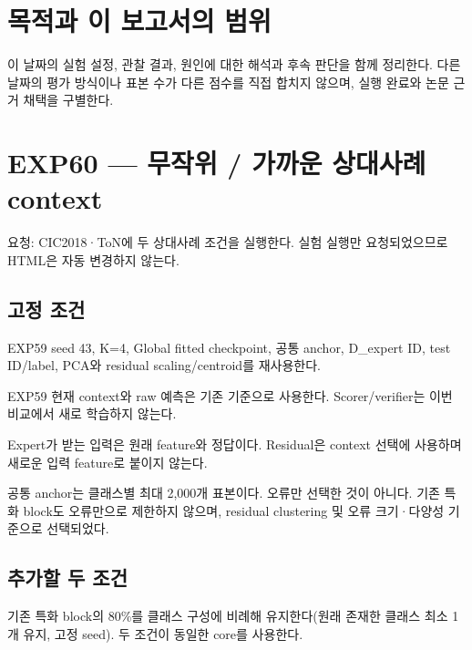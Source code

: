 




\section*{목적과 이 보고서의 범위}

이 날짜의 실험 설정, 관찰 결과, 원인에 대한 해석과 후속 판단을 함께 정리한다. 다른 날짜의 평가 방식이나 표본 수가 다른 점수를 직접 합치지 않으며, 실행 완료와 논문 근거 채택을 구별한다.


\section{EXP60 — 무작위 /\allowbreak{} 가까운 상대사례 context}
요청: CIC2018·ToN에 두 상대사례 조건을 실행한다. 실험 실행만 요청되었으므로 HTML은 자동 변경하지 않는다.

\subsection{고정 조건}
\par\noindent \textbullet\enspace EXP59 seed 43, K=\allowbreak{}4, Global fitted checkpoint, 공통 anchor, D\_\allowbreak{}expert ID, test ID/\allowbreak{}label, PCA와 residual scaling/\allowbreak{}centroid를 재사용한다.


\par\noindent \textbullet\enspace EXP59 현재 context와 raw 예측은 기존 기준으로 사용한다. Scorer/\allowbreak{}verifier는 이번 비교에서 새로 학습하지 않는다.


\par\noindent \textbullet\enspace Expert가 받는 입력은 원래 feature와 정답이다. Residual은 context 선택에 사용하며 새로운 입력 feature로 붙이지 않는다.


\par\noindent \textbullet\enspace 공통 anchor는 클래스별 최대 2,000개 표본이다. 오류만 선택한 것이 아니다. 기존 특화 block도 오류만으로 제한하지 않으며, residual clustering 및 오류 크기·다양성 기준으로 선택되었다.


\subsection{추가할 두 조건}
\par\noindent \textbullet\enspace 기존 특화 block의 80\%를 클래스 구성에 비례해 유지한다(원래 존재한 클래스 최소 1개 유지, 고정 seed). 두 조건이 동일한 core를 사용한다.


